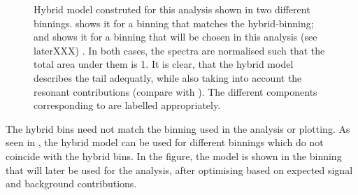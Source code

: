 \begin{figure}[htbp!]
    \caption{\label{fig:hybrid_bins_and_model} Hybrid model construted for this analysis 
    shown in two different binnings.
     shows it for a binning that matches the hybrid-binning; 
    and  shows it for a binning that will 
    be chosen in this analysis (see laterXXX) .
    In both cases, the spectra are normalised such that the total area under them is 1.
    It is clear, that the hybrid model describes the tail adequatly, 
    while also taking into account the resonant contributions (compare with ).
    The different components corresponding to  are labelled appropriately.
    }
\end{figure}

The hybrid bins need not match the binning used in the analysis or plotting.
As seen in , the hybrid model can be used for different binnings which do not coincide with the hybrid bins.
In the figure, the model is shown in the binning that will later be used for the analysis, after optimising based on expected signal and background contributions.

